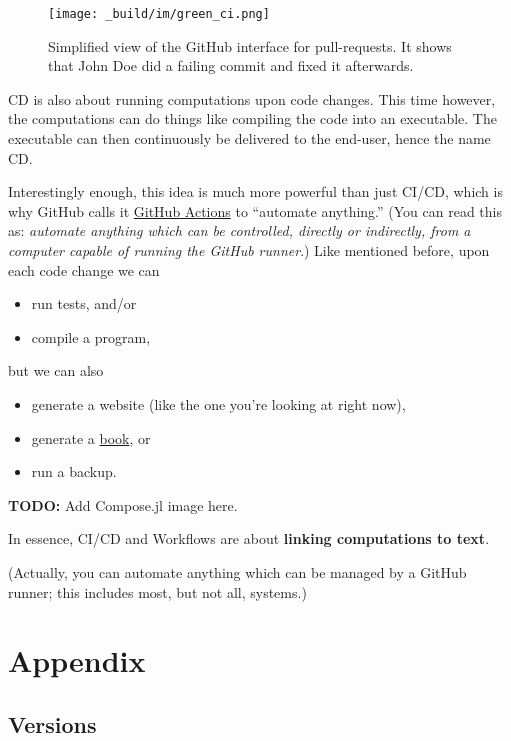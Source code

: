 \documentclass[
  14pt
  american,
  paper=a4,
  ,captions=tableheading
]{scrbook}
\providecommand{\tightlist}{%
  \setlength{\itemsep}{0pt}\setlength{\parskip}{0pt}}
\begin{document}
\begin{figure}
\hypertarget{fig:green_ci}{%
\centering
\texttt{[image: \_build/im/green\_ci.png]}
\caption{Simplified view of the GitHub interface for pull-requests. It
shows that John Doe did a failing commit and fixed it
afterwards.}\label{fig:green_ci}
}
\end{figure}

CD is also about running computations upon code changes. This time
however, the computations can do things like compiling the code into an
executable. The executable can then continuously be delivered to the
end-user, hence the name CD.

Interestingly enough, this idea is much more powerful than just CI/CD,
which is why GitHub calls it \href{https://github.com/home/}{GitHub
Actions} to ``automate anything.'' (You can read this as: \emph{automate
anything which can be controlled, directly or indirectly, from a
computer capable of running the GitHub runner}.) Like mentioned before,
upon each code change we can

\begin{itemize}
\tightlist
\item
  run tests, and/or
\item
  compile a program,
\end{itemize}

but we can also

\begin{itemize}
\tightlist
\item
  generate a website (like the one you're looking at right now),
\item
  generate a \href{https://github.com/hadley/r4ds}{book}, or
\item
  run a backup.
\end{itemize}

\textbf{TODO:} Add Compose.jl image here.

In essence, CI/CD and Workflows are about \textbf{linking computations
to text}.

(Actually, you can automate anything which can be managed by a GitHub
runner; this includes most, but not all, systems.)

\hypertarget{sec:appendix}{%
\chapter{Appendix}\label{sec:appendix}}

\hypertarget{versions}{%
\section{Versions}\label{versions}}
\end{document}

